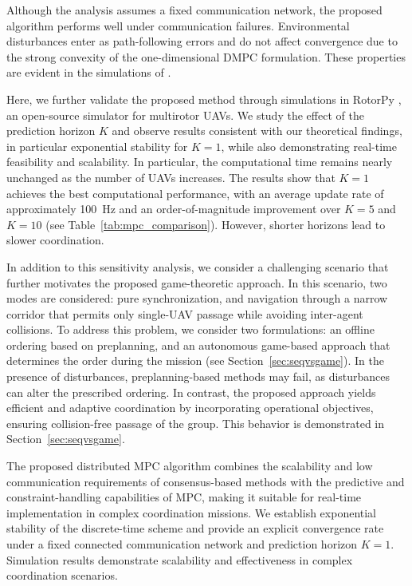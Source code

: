 \documentclass[letterpaper,journal]{IEEEtran}
\begin{document}
Although the analysis assumes a fixed communication network, the proposed algorithm performs well under communication failures. Environmental disturbances enter as path-following errors and do not affect convergence due to the strong convexity of the one-dimensional DMPC formulation. These properties are evident in the simulations of \cite{paper}.

Here, we further validate the proposed method through simulations in RotorPy \cite{folk2023rotorpy}, an open-source simulator for multirotor UAVs. We study the effect of the prediction horizon $K$ and observe results consistent with our theoretical findings, in particular exponential stability for $K=1$, while also demonstrating real-time feasibility and scalability. In particular, the computational time remains nearly unchanged as the number of UAVs increases.
The results show that $K=1$ achieves the best computational performance, with an average update rate of approximately 100~Hz and an order-of-magnitude improvement over $K=5$ and $K=10$ (see Table~\ref{tab:mpc_comparison}). However, shorter horizons lead to slower coordination.

In addition to this sensitivity analysis, we consider a challenging scenario that further motivates the proposed game-theoretic approach. In this scenario, two modes are considered: pure synchronization, and navigation through a narrow corridor that permits only single-UAV passage while avoiding inter-agent collisions. 
To address this problem, we consider two formulations: an offline ordering based on preplanning, and an autonomous game-based approach that determines the order during the mission (see Section~\ref{sec:seqvsgame}). 
In the presence of disturbances, preplanning-based methods may fail, as disturbances can alter the prescribed ordering. In contrast, the proposed approach yields efficient and adaptive coordination by incorporating operational objectives, ensuring collision-free passage of the group. This behavior is demonstrated in Section~\ref{sec:seqvsgame}.

The proposed distributed MPC algorithm combines the scalability and low communication requirements of consensus-based methods with the predictive and constraint-handling capabilities of MPC, making it suitable for real-time implementation in complex coordination missions. 
We establish exponential stability of the discrete-time scheme and provide an explicit convergence rate under a fixed connected communication network and prediction horizon $K=1$.  Simulation results demonstrate scalability and effectiveness in complex coordination scenarios.
\end{document}
